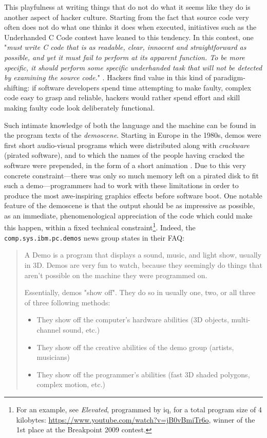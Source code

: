 This playfulness at writing things that do not do what it seems like they do is another aspect of hacker culture. Starting from the fact that source code very often does not do what one thinks it does when executed, initiatives such as the Underhanded C Code contest have leaned to this tendency. In this contest, one "\emph{must write C code that is as readable, clear, innocent and straightforward as possible, and yet it must fail to perform at its apparent function. To be more specific, it should perform some specific underhanded task that will not be detected by examining the source code.}" \citep{craver_underhanded_2015}. Hackers find value in this kind of paradigm-shifting: if software developers spend time attempting to make faulty, complex code easy to grasp and reliable, hackers would rather spend effort and skill making faulty code look deliberately functional.

Such intimate knowledge of both the language and the machine can be found in the program texts of the \emph{demoscene}. Starting in Europe in the 1980s, demos were first short audio-visual programs which were distributed along with \emph{crackware} (pirated software), and to which the names of the people having cracked the software were prepended, in the form of a short animation \citep{reunanen_computer_2010}. Due to this very concrete constraint—there was only so much memory left on a pirated disk to fit such a demo—programmers had to work with these limitations in order to produce the most awe-inspiring graphics effects before software boot. One notable feature of the demoscene is that the output should be as impressive as possible, as an immediate, phenomenological appreciation of the code which could make this happen, within a fixed technical constraint\footnote{For an example, see \emph{Elevated}, programmed by iq, for a total program size of 4 kilobytes: \url{https://www.youtube.com/watch?v=jB0vBmiTr6o}, winner of the 1st place at the Breakpoint 2009 contest.}. Indeed, the \lstinline{comp.sys.ibm.pc.demos} news group states in their FAQ:

\begin{quote}
  A Demo is a program that displays a sound, music, and light show, usually in 3D. Demos are very fun to watch, because they seemingly do things that aren't possible on the machine they were programmed on.

  Essentially, demos "show off". They do so in usually one, two, or all three of three following methods:

  \begin{itemize}
    \item{They show off the computer's hardware abilities (3D objects, multi-channel sound, etc.)}
    \item{They show off the creative abilities of the demo group (artists, musicians)}
    \item{They show off the programmer's abilities (fast 3D shaded polygons, complex motion, etc.)}
  \end{itemize}
  \citep{melik_pc_2012}
\end{quote}


